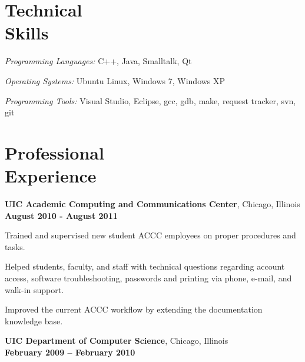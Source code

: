 \documentclass[margin,line]{resume}
\begin{document}
\begin{resume}
	\vspace{2mm}

  \section{\mysidestyle Technical\\Skills}
    \begin{list2}
		\item {\sl Programming Languages:}  C++, Java, Smalltalk, Qt
		\item {\sl Operating Systems:}  Ubuntu Linux, Windows 7, Windows XP
        \item {\sl Programming Tools:} Visual Studio, Eclipse, gcc, gdb, make, request tracker, svn, git
    \end{list2}

    \section{\mysidestyle Professional\\Experience}
	\vspace{2mm}



    {\bf UIC Academic Computing and Communications Center}, Chicago, Illinois\\
    \vspace{1mm}{\sl Computer Consultant } \hfill {\bf August 2010 - August 2011}
    \begin{list2}
        \item Trained and supervised new student ACCC employees on proper procedures and tasks.
        \item Helped students, faculty, and staff with technical questions regarding account access, software troubleshooting, passwords and printing via phone, e-mail, and walk-in support.
        \item Improved the current ACCC workflow by extending the documentation knowledge base.  
    \end{list2}

    {\bf UIC Department of Computer Science}, Chicago, Illinois\\
    \vspace{1mm}{\sl ACCC Computer Specialist} \hfill {\bf February 2009 -- February 2010}
    


\end{resume}
\end{document}
